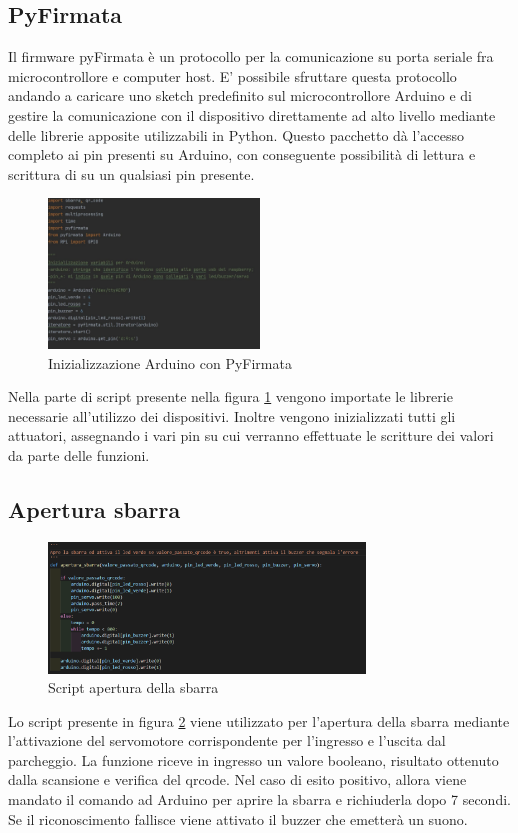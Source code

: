 \documentclass[a4paper,11pt]{report}
\begin{document}
\subsection{PyFirmata}
Il firmware pyFirmata è un protocollo per la comunicazione su porta seriale fra microcontrollore e computer host. E' possibile sfruttare questa protocollo andando a caricare uno sketch predefinito sul microcontrollore Arduino e di gestire la comunicazione con il dispositivo direttamente ad alto livello mediante delle librerie apposite utilizzabili in Python. Questo pacchetto dà l’accesso completo ai pin presenti su Arduino, con conseguente possibilità di lettura e scrittura di su un qualsiasi pin presente.
\begin{figure}[H]
	\centering
	\includegraphics[width=0.5\textwidth]{figure/ini_arduino.jpg}
	\caption{Inizializzazione Arduino con PyFirmata}
	\label{pyfirmata}
\end{figure}
Nella parte di script presente nella figura \ref{pyfirmata} vengono importate le librerie necessarie all'utilizzo dei dispositivi. Inoltre vengono inizializzati tutti gli attuatori, assegnando i vari pin su cui verranno effettuate le scritture dei valori da parte delle funzioni.

\subsection{Apertura sbarra}
\begin{figure}[H]
	\centering
	\includegraphics[width=0.75\textwidth]{figure/apertura_sbarra}
	\caption{Script apertura della sbarra}
	\label{apertura_sbarra}
\end{figure}
Lo script presente in figura \ref{apertura_sbarra} viene utilizzato per l’apertura della sbarra mediante l'attivazione del servomotore corrispondente per l’ingresso e l’uscita dal parcheggio.
La funzione riceve in ingresso un valore booleano, risultato ottenuto dalla scansione e verifica del qrcode. Nel caso di esito positivo, allora viene mandato il comando ad Arduino per aprire la sbarra e richiuderla dopo 7 secondi.
Se il riconoscimento fallisce viene attivato il buzzer che emetterà un suono.
\end{document}
